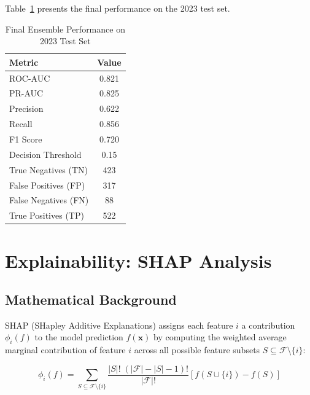 \documentclass[conference]{IEEEtran}
\begin{document}
Table~\ref{tab:final_perf} presents the final performance on the
2023 test set.

\begin{table}[htbp]
  \caption{Final Ensemble Performance on 2023 Test Set}
  \label{tab:final_perf}
  \centering
  \renewcommand{\arraystretch}{1.15}
  \setlength{\tabcolsep}{4pt}
  \begin{tabular}{lc}
    \toprule
    \textbf{Metric} & \textbf{Value} \\
    \midrule
    ROC-AUC              & 0.821 \\
    PR-AUC               & 0.825 \\
    Precision            & 0.622 \\
    Recall               & 0.856 \\
    F1 Score             & 0.720 \\
    Decision Threshold   & 0.15  \\
    \midrule
    True Negatives  (TN) & 423   \\
    False Positives (FP) & 317   \\
    False Negatives (FN) & 88    \\
    True Positives  (TP) & 522   \\
    \bottomrule
  \end{tabular}
\end{table}

\section{Explainability: SHAP Analysis}
\label{sec:shap}

\subsection{Mathematical Background}

SHAP (SHapley Additive Explanations) assigns each feature $i$ a
contribution $\phi_i(f)$ to the model prediction $f(\mathbf{x})$
by computing the weighted average marginal contribution of feature $i$
across all possible feature subsets $S \subseteq \mathcal{F} \setminus \{i\}$:

\begin{equation}
  \phi_i(f) = \sum_{S \subseteq \mathcal{F} \setminus \{i\}}
  \frac{|S|!\;(|\mathcal{F}|-|S|-1)!}{|\mathcal{F}|!}
  \left[f(S \cup \{i\}) - f(S)\right]
  \label{eq:shap}
\end{equation}
\end{document}
